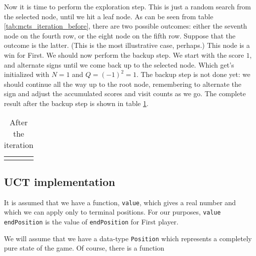 Now it is time to perform the exploration step.
This is just a random search from the selected node, until we hit a leaf node.
As can be seen from table \ref{tab:mcts_iteration_before}, there are two possible outcomes: either the seventh node on the fourth row, or the eight node on the fifth row.
Suppose that the outcome is the latter. (This is the most illustrative case, perhaps.)
This node is a win for First.
We should now perform the backup step. We start with the score $1$, and alternate signs until we come back up to the selected node. Which get's initialized with $N=1$ and $Q=(-1)^2 = 1$.
The backup step is not done yet: we should continue all the way up to the root node, remembering to alternate the sign and adjust the accumulated scores and visit counts as we go.
The complete result after the backup step is shown in table \ref{fig:mcts_iteration_after}.
\begin{center}
\def\arraystretch{5.5}
\begin{table}
\begin{tabular}{l}
  \def\svgwidth{\columnwidth} 
\end{tabular}
\caption{After the iteration}
\label{fig:mcts_iteration_after}
\end{table}
\end{center}

\subsection{UCT implementation}


It is assumed that we have a function, \texttt{value}, which gives a real number and which we can apply only to terminal positions.
For our purposes, \texttt{value endPosition} is the value of \texttt{endPosition} for First player.

We will assume that we have a data-type \texttt{Position} which represents a completely pure state of the game.
Of course, there is a function

